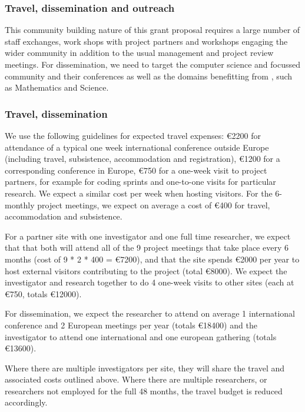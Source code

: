 
\subsubsection{Travel, dissemination and outreach}
\label{sect:budget-details-travel}

This community building nature of this grant proposal requires a large
number of staff exchanges, work shops with project partners and
workshops engaging the wider community in addition to the usual
management and project review meetings. For dissemination, we need to
target the computer science and focussed community and their conferences
as well as the domains benefitting from \TheProject, such as 
Mathematics and Science.

\subsubsection{Travel, dissemination}

We use the following guidelines for expected travel expenses:
\euro{2200} for attendance of a typical one week international
conference outside Europe (including travel, subsistence,
accommodation and registration), \euro{1200} for a corresponding
conference in Europe, \euro{750} for a one-week visit to project
partners, for example for coding sprints and one-to-one visits for
particular research. We expect a similar cost per week when hosting
visitors. For the 6-monthly project meetings, we expect on average a
cost of \euro{400} for travel, accommodation and subsistence.

For a partner site with one investigator and one full time researcher,
we expect that that both will attend all of the 9 project meetings that take 
place every 6 months (cost of 9 * 2 * 400 =
\euro{7200}), and that the site spends \euro{2000} per year to host
external visitors contributing to the project (total \euro{8000}). We
expect the investigator and research together to do 4 one-week visits
to other sites (each at \euro{750}, totals \euro{12000}). 


For dissemination, we expect the researcher to attend on average 1
international conference and 2 European meetings per year (totals
\euro{18400}) and the investigator to attend one international and one
european gathering (totals \euro{13600}).

Where there are multiple investigators per site, they will share the
travel and associated costs outlined above. Where there are multiple
researchers, or researchers not employed for the full 48 months, the
travel budget is reduced accordingly.

